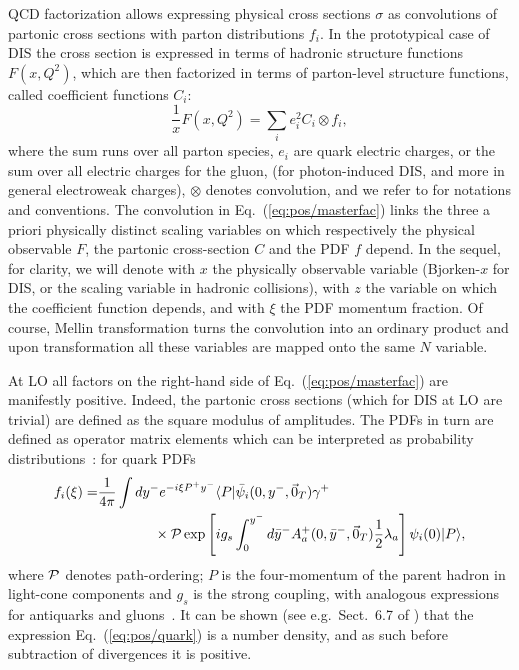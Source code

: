 
QCD factorization allows expressing physical cross sections $\sigma$  as
convolutions of partonic cross sections with parton distributions $f_i$. 
In the prototypical case of DIS the cross section is expressed in terms of
hadronic structure functions $F(x,Q^2)$, which are then factorized in terms of
parton-level structure functions, called coefficient functions $C_i$:
\begin{equation}
  \label{eq:pos/masterfac}
 \frac{1}{x} F(x,Q^2)=\sum_{i} e^2_i C_i \otimes f_i ,
\end{equation}
where the sum runs over all parton species, $e_i$ are quark electric charges,
or the sum over all electric charges for the gluon, (for photon-induced DIS,
and more in general electroweak charges), $\otimes$ denotes convolution, and we
refer to \cite{Ellis:1991qj} for notations and conventions. 
The convolution in Eq.~(\ref{eq:pos/masterfac}) links the three a priori physically
distinct scaling variables on which respectively the physical observable $F$,
the partonic cross-section $C$ and the PDF $f$ depend.
In the sequel, for
clarity, we will denote with $x$ the physically observable variable
(Bjorken-$x$ for DIS, or the scaling variable in hadronic collisions), with $z$
the variable on which the coefficient function depends, and with $\xi$ the PDF
momentum fraction.
Of course, Mellin transformation turns the convolution into an ordinary product
and upon transformation all these variables are mapped onto the same $N$
variable. 
 
At LO all factors on the right-hand side of Eq.~(\ref{eq:pos/masterfac}) are
manifestly positive.
Indeed, the partonic cross sections (which for DIS at LO are trivial) are
defined as the square modulus of amplitudes. 
The PDFs in turn are defined as operator matrix elements which can be
interpreted as probability distributions~\cite{Collins:1981uw,Curci:1980uw}:
for quark PDFs~\cite{Collins:1981uw}  
\begin{align}
    \label{eq:pos/quark}
    f_i(\xi)=
    &\frac{1}{4\pi}\int dy^- e^{-i \xi P^+ y^-}
    \langle P| \bar \psi_i(0,y^-,\vec 0_T)\gamma^+
    \nonumber\\ 
    &\qquad\qquad
    \times{\cal P} \exp\left[ i g_s \int_0^{y^-} d
    \bar y^- A_a^+(0,\bar y^-,\vec 0_T)\frac{1}{2} \lambda_a\right] \psi_i(0) |P\rangle ,
\end{align}
where ${\cal P}$ denotes path-ordering; $P$ is the four-momentum of
the parent hadron in light-cone components and $g_s$ is the strong
coupling, with analogous expressions for antiquarks and
gluons~\cite{Collins:1981uw}.  It can be shown (see
e.g.\ Sect.~6.7 of \cite{Collins:2011zzd}) that the expression
Eq.~(\ref{eq:pos/quark}) is a number density, and as such before
subtraction of divergences it is positive.

